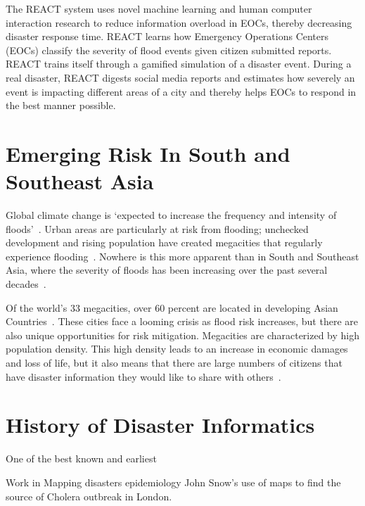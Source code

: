 The REACT system uses novel machine learning and human computer interaction
research to reduce information overload in EOCs, thereby decreasing disaster
response time. REACT learns how Emergency Operations Centers (EOCs) classify the
severity of flood events given citizen submitted reports. REACT trains itself
through a gamified simulation of a disaster event. During a real disaster, REACT
digests social media reports and estimates how severely an event is impacting
different areas of a city and thereby helps EOCs to respond in the best manner
possible.

\section{Emerging Risk In South and Southeast Asia}
Global climate change is `expected to increase the frequency and intensity of
floods'~\cite{ahernGlobalHealthImpacts2005}.  Urban areas are particularly at
risk from flooding; unchecked development and rising population have created
megacities that regularly experience flooding~\cite{chanFloodRiskAsia2012}. Nowhere is
this more apparent than in South and Southeast Asia, where the severity of
floods has been increasing over the past several
decades~\cite{tortiFloodsSoutheastAsia2012}.

Of the world's 33 megacities, over 60 percent are located in developing Asian
Countries~\cite{unitednationsdepartmentofeconomicandsocialaffairsWorldCities20162016}.
These cities face a looming crisis as flood risk increases, but there are also
unique opportunities for risk mitigation. Megacities are characterized by high
population density. This high density leads to an increase in economic damages
and loss of life, but it also means that there are large numbers of citizens
that have disaster information they would like to share with
others~\cite{chanFloodRiskAsia2012}.

\section{History of Disaster Informatics}
One of the best known and earliest

Work in Mapping disasters epidemiology
John Snow's use of maps to find the source of Cholera outbreak in
London\cite{rogersJohnSnowData2013}.

